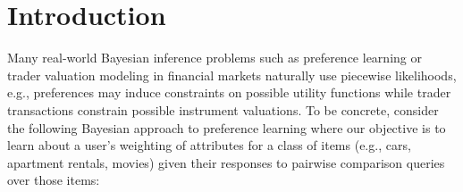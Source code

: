 \section{Introduction}

Many real-world Bayesian inference problems such as preference
learning or trader valuation modeling in financial markets naturally
use piecewise likelihoods, e.g., preferences may induce constraints 
on possible utility functions while trader transactions constrain 
possible instrument valuations. \cite{Shogren:00}
To be concrete, consider the following Bayesian approach to preference
learning where our objective is to learn about a user's weighting of
attributes for a class of items (e.g., cars, apartment rentals, movies)
given their responses to pairwise comparison queries over those items:

